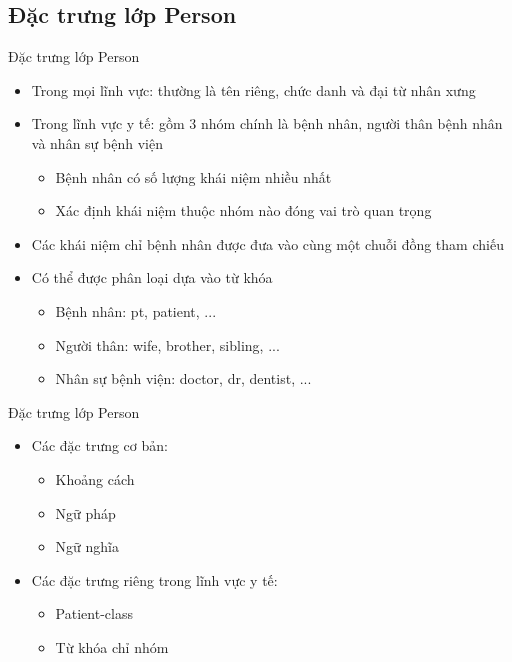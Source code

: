\subsection{Đặc trưng lớp Person}
\begin{frame}{Đặc trưng lớp Person}
\putlogo
\begin{itemize}
	\item Trong {\color{red} mọi lĩnh vực}: thường là tên riêng, chức danh và đại từ nhân xưng
	\item Trong {\color{red} lĩnh vực y tế}: gồm 3 nhóm chính là bệnh nhân, người thân bệnh nhân và nhân sự bệnh viện
	\begin{itemize}
		\item Bệnh nhân có số lượng khái niệm nhiều nhất
		\item Xác định khái niệm thuộc nhóm nào đóng vai trò quan trọng
	\end{itemize}
	\item Các khái niệm chỉ bệnh nhân được đưa vào cùng một chuỗi đồng tham chiếu
	\item Có thể được phân loại dựa vào {\color{red} từ khóa}
	\begin{itemize}
		\item Bệnh nhân: pt, patient, ...
		\item Người thân: wife, brother, sibling, ...
		\item Nhân sự bệnh viện: doctor, dr, dentist, ...
	\end{itemize}
\end{itemize}
\end{frame}

\begin{frame}{Đặc trưng lớp Person}
\putlogo
\begin{itemize}
	\item Các đặc trưng {\color{red} cơ bản}:
	\begin{itemize}
		\item Khoảng cách
		\item Ngữ pháp
		\item Ngữ nghĩa
	\end{itemize}		
	\item Các đặc trưng riêng trong {\color{red} lĩnh vực y tế}:
	\begin{itemize}
		\item Patient-class
		\item Từ khóa chỉ nhóm
	\end{itemize}
\end{itemize}
\end{frame}

